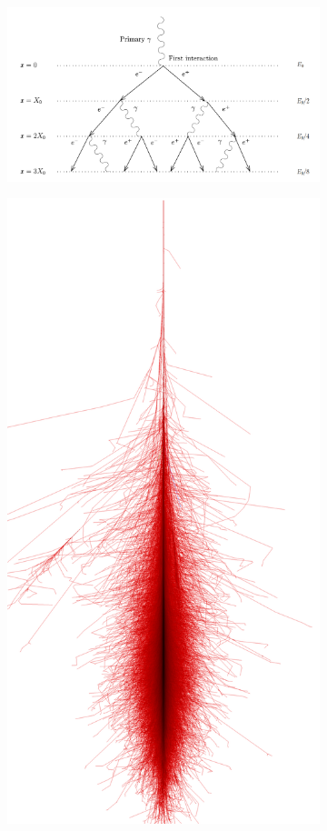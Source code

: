 \begin{figure}
	\centering
	\begin{subfigure}{.7\textwidth}
  		\centering
  		\includegraphics[width=\linewidth]{images/em_shower_illustration.png}
	\end{subfigure}%
	\begin{subfigure}{.3\textwidth}
 		\centering
		\includegraphics[width=.9\linewidth]{images/corsika_1tev_photon.png}

\end{subfigure}
\end{figure}
